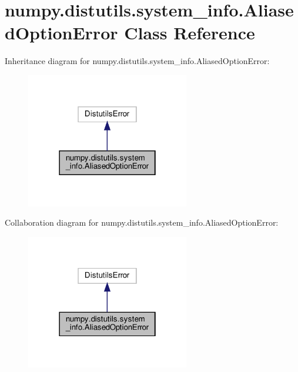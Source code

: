 \hypertarget{classnumpy_1_1distutils_1_1system__info_1_1AliasedOptionError}{}\section{numpy.\+distutils.\+system\+\_\+info.\+Aliased\+Option\+Error Class Reference}
\label{classnumpy_1_1distutils_1_1system__info_1_1AliasedOptionError}


Inheritance diagram for numpy.\+distutils.\+system\+\_\+info.\+Aliased\+Option\+Error\+:
\nopagebreak
\begin{figure}[H]
\begin{center}
\leavevmode
\includegraphics[width=202pt]{classnumpy_1_1distutils_1_1system__info_1_1AliasedOptionError__inherit__graph}
\end{center}
\end{figure}


Collaboration diagram for numpy.\+distutils.\+system\+\_\+info.\+Aliased\+Option\+Error\+:
\nopagebreak
\begin{figure}[H]
\begin{center}
\leavevmode
\includegraphics[width=202pt]{classnumpy_1_1distutils_1_1system__info_1_1AliasedOptionError__coll__graph}
\end{center}
\end{figure}


